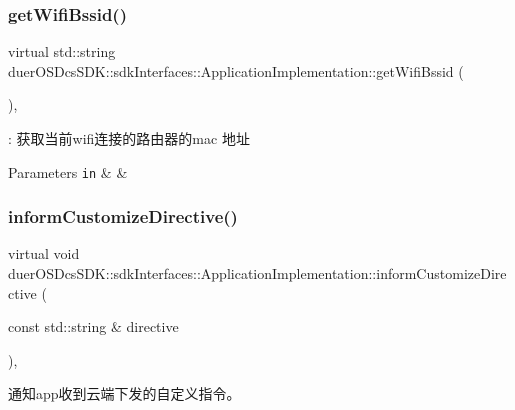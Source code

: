 \subsubsection{\texorpdfstring{get\+Wifi\+Bssid()}{getWifiBssid()}}
{\footnotesize\ttfamily virtual std\+::string duer\+O\+S\+Dcs\+S\+D\+K\+::sdk\+Interfaces\+::\+Application\+Implementation\+::get\+Wifi\+Bssid (\begin{DoxyParamCaption}{ }\end{DoxyParamCaption})\hspace{0.3cm}{\ttfamily [inline]}, {\ttfamily [virtual]}}



\+: 获取当前wifi连接的路由器的mac 地址 


\begin{DoxyParams}[1]{Parameters}
\mbox{\tt in}  & {\em } & \\
\hline
\end{DoxyParams}
\mbox{\label{classduerOSDcsSDK_1_1sdkInterfaces_1_1ApplicationImplementation_a239692cd30f184acb165447c9484cf9a}} 
\subsubsection{\texorpdfstring{inform\+Customize\+Directive()}{informCustomizeDirective()}}
{\footnotesize\ttfamily virtual void duer\+O\+S\+Dcs\+S\+D\+K\+::sdk\+Interfaces\+::\+Application\+Implementation\+::inform\+Customize\+Directive (\begin{DoxyParamCaption}\item[{const std\+::string \&}]{directive }\end{DoxyParamCaption})\hspace{0.3cm}{\ttfamily [inline]}, {\ttfamily [virtual]}}



通知app收到云端下发的自定义指令。 


